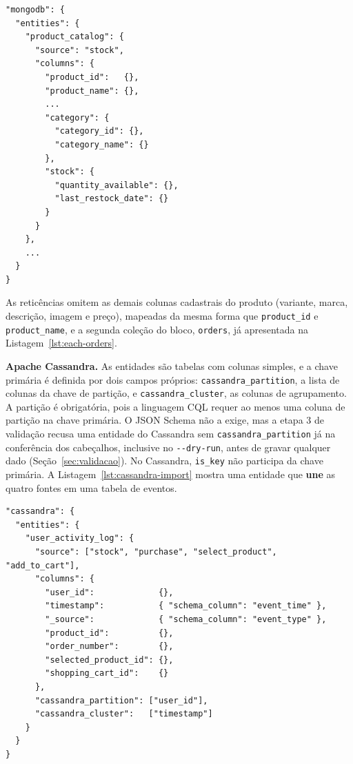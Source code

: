 \begin{lstlisting}[style=jsonstyle,caption={Fragmento de importação MongoDB com subdocumentos.},label={lst:mongo-import}]
"mongodb": {
  "entities": {
    "product_catalog": {
      "source": "stock",
      "columns": {
        "product_id":   {},
        "product_name": {},
        ...
        "category": {
          "category_id": {},
          "category_name": {}
        },
        "stock": {
          "quantity_available": {},
          "last_restock_date": {}
        }
      }
    },
    ...
  }
}
\end{lstlisting}

As reticências omitem as demais colunas cadastrais do produto (variante, marca,
descrição, imagem e preço), mapeadas da mesma forma que \texttt{product\_id} e
\texttt{product\_name}, e a segunda coleção do bloco, \texttt{orders}, já apresentada na
Listagem~\ref{lst:each-orders}.

\textbf{Apache Cassandra.} As entidades são tabelas com colunas simples, e a chave
primária é definida por dois campos próprios: \texttt{cassandra\_\allowbreak partition},
a lista de colunas da chave de partição, e \texttt{cassandra\_\allowbreak cluster}, as
colunas de agrupamento. A partição é obrigatória, pois a linguagem CQL requer ao menos uma
coluna de partição na chave primária. O JSON Schema não a exige, mas a etapa 3 de
validação recusa uma entidade do Cassandra sem \texttt{cassandra\_\allowbreak partition}
já na conferência dos cabeçalhos, inclusive no \texttt{-{}-dry-run}, antes de gravar
qualquer dado (Seção~\ref{sec:validacao}). No Cassandra, \texttt{is\_key} não
participa da chave primária. A Listagem~\ref{lst:cassandra-import} mostra uma entidade
que \textbf{une} as quatro fontes em uma tabela de eventos.

\begin{lstlisting}[style=jsonstyle,caption={Fragmento de importação Cassandra com união de fontes e chave composta.},label={lst:cassandra-import}]
"cassandra": {
  "entities": {
    "user_activity_log": {
      "source": ["stock", "purchase", "select_product", "add_to_cart"],
      "columns": {
        "user_id":             {},
        "timestamp":           { "schema_column": "event_time" },
        "_source":             { "schema_column": "event_type" },
        "product_id":          {},
        "order_number":        {},
        "selected_product_id": {},
        "shopping_cart_id":    {}
      },
      "cassandra_partition": ["user_id"],
      "cassandra_cluster":   ["timestamp"]
    }
  }
}
\end{lstlisting}

